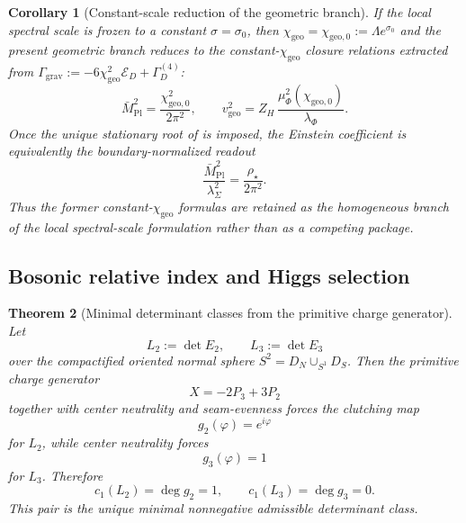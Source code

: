 \documentclass[11pt,a4paper]{article}
\newtheorem{theorem}{Theorem}[section]
\newtheorem{corollary}[theorem]{Corollary}
\theoremstyle{definition}
\theoremstyle{remark}
\newcommand{\Mpl}{\bar M_{\mathrm{Pl}}}
\newcommand{\chigeo}{\chi_{\mathrm{geo}}}
\newcommand{\chigeozero}{\chi_{\mathrm{geo},0}}
\newcommand{\vgeo}{v_{\mathrm{geo}}}
\begin{document}
\begin{corollary}[Constant-scale reduction of the geometric branch]
\label{cor:constant-scale-reduction}
If the local spectral scale is frozen to a constant $\sigma=\sigma_0$, then
$\chigeo=\chigeozero:=\Lambda e^{\sigma_0}$ and the present geometric branch reduces to the
constant-$\chigeo$ closure relations extracted from
$\Gamma_{\mathrm{grav}}:=-6\chigeo^2\mathcal E_D+\Gamma_D^{(4)}$:
\[
\Mpl^2=\frac{\chigeozero^2}{2\pi^2},
\qquad
\vgeo^2=Z_H\,\frac{\mu_\Phi^2(\chigeozero)}{\lambda_\Phi}.
\]
Once the unique stationary root of  is imposed, the
Einstein coefficient is equivalently the boundary-normalized readout
\[
\frac{\Mpl^2}{\lambda_\Sigma^2}=\frac{\rho_\star}{2\pi^2}.
\]
Thus the former constant-$\chigeo$ formulas are retained as the homogeneous branch of the local
spectral-scale formulation rather than as a competing package.
\end{corollary}


\subsection{Bosonic relative index and Higgs selection}

\begin{theorem}[Minimal determinant classes from the primitive charge generator]
\label{thm:determinant-class-higgs-selection}
\label{thm:determinant-clutching}
Let
\[
L_2:=\det E_2,
\qquad
L_3:=\det E_3
\]
over the compactified oriented normal sphere $S^2=D_N\cup_{S^1}D_S$. Then the primitive charge
generator
\[
X=-2P_3+3P_2
\]
together with center neutrality and seam-evenness forces the clutching map
\[
g_2(\varphi)=e^{i\varphi}
\]
for $L_2$, while center neutrality forces
\[
g_3(\varphi)=1
\]
for $L_3$. Therefore
\[
c_1(L_2)=\deg g_2=1,
\qquad
c_1(L_3)=\deg g_3=0.
\]
This pair is the unique minimal nonnegative admissible determinant class.
\end{theorem}
\end{document}
